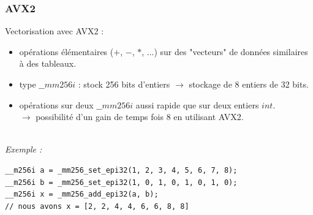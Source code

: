 \documentclass[8pt]{beamer}
\begin{document}
\begin{frame}[fragile]
\frametitle{AVX2}

Vectorisation avec AVX2 :\\[0.2cm]
\begin{itemize}
    \item opérations élémentaires ($+$, $-$, $*$, ...) sur des "vecteurs" de données similaires à des tableaux.
    \item type $\_\_mm256i$ : stock 256 bits d'entiers $\to$ stockage de 8 entiers de 32 bits.
    \item opérations sur deux $\_\_mm256i$ aussi rapide que sur deux entiers $int$.\\ $\to$ possibilité d'un gain de temps fois $8$ en utilisant AVX2.
\end{itemize}
\ \\[0.2cm]
\textit{Exemple :} 
\begin{lstlisting}
__m256i a = _mm256_set_epi32(1, 2, 3, 4, 5, 6, 7, 8);
__m256i b = _mm256_set_epi32(1, 0, 1, 0, 1, 0, 1, 0);
__m256i x = _mm256_add_epi32(a, b);
// nous avons x = [2, 2, 4, 4, 6, 6, 8, 8]
\end{lstlisting}
\end{frame}

\newtheorem{Ex1}{Comment faire le modulo sur des vecteurs ?}
\newtheorem{Ex2}{Exemple}
\newtheorem{Ex3}{Preuve}
\end{document}
